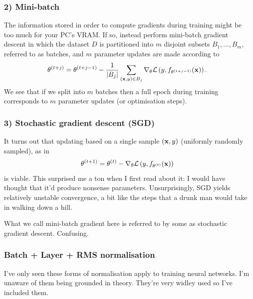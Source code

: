\documentclass[11pt]{article}
\begin{document}
\subsubsection*{2) Mini-batch}
The information stored in order to compute gradients during training might be too much for your PC's VRAM. If so, instead perform mini-batch gradient descent in which the dataset $D$ is partitioned into $m$ disjoint subsets $B_1,\dots,B_m$, referred to as batches, and $m$ parameter updates are made according to
$$
\theta^{(t+j)}
=
\theta^{(t+j-1)}-\frac{1}{|B_j|}\sum_{(\mathbf{x},y)\in B_j} \nabla_{\theta}\mathcal{L}\left(y,f_{\theta^{(t+j-1)}}(\mathbf{x})\right).
$$
We see that if we split into $m$ batches then a full epoch during training corresponds to $m$ parameter updates (or optimisation steps).

\subsubsection*{3) Stochastic gradient descent (SGD)}
It turns out that updating based on a single sample $(\mathbf{x},y)$ (uniformly randomly sampled), as in
$$
\theta^{(t+1)}
=
\theta^{(t)}-\nabla_{\theta}\mathcal{L}\left(y,f_{\theta^{(t)}}(\mathbf{x})\right)
$$
is viable. This surprised me a ton when I first read about it: I would have thought that it'd produce nonsense parameters. Unsurprisingly, SGD yields relatively unstable convergence, a bit like the steps that a drunk man would take in walking down a hill.

\begin{tcolorbox}[title={\centering\textbf{Terminology warning}}, colback=myLightBlue, colbacktitle=myDarkBlue, colframe=myDarkBlue, coltitle=white]
    What we call mini-batch gradient here is referred to by some as stochastic gradient descent. Confusing.
\end{tcolorbox}

\subsubsection{Batch + Layer + RMS normalisation}
I've only seen these forms of normalisation apply to training neural networks. I'm unaware of them being grounded in theory. They're very widley used so I've included them.
\end{document}
